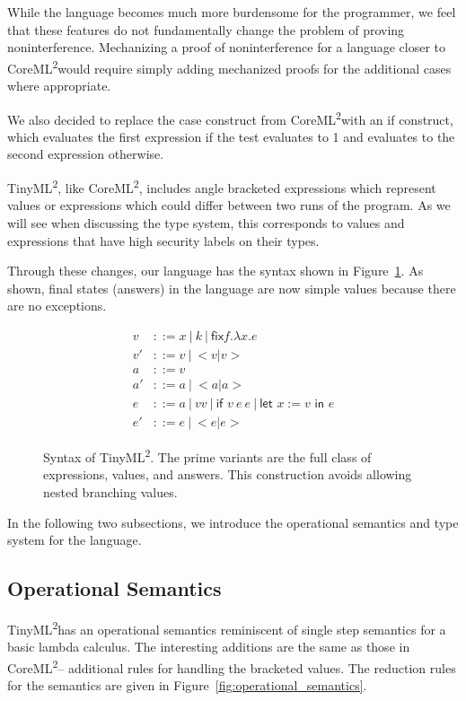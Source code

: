 \documentclass[a4paper,twocolumn]{article}
\newcommand{\langName}[0]{TinyML\textsuperscript{2}}
\newcommand{\origLang}[0]{CoreML\textsuperscript{2}}
\theoremstyle{plain}
\theoremstyle{definition}
\begin{document}
While the language becomes much more burdensome for the programmer, we
feel that these features do not fundamentally change the problem of proving
noninterference.  Mechanizing a proof of noninterference for a
language closer to \origLang would require simply adding mechanized proofs
for the additional cases where appropriate.

We also decided to replace the
\textsf{case} construct from \origLang with an \textsf{if} construct, which
evaluates the first expression if the test evaluates to 1 and evaluates to the
second expression otherwise.

\langName, like \origLang, includes angle bracketed expressions which represent
values or expressions which could differ between two runs of the program.  As we
will see when discussing the type system, this corresponds to values and
expressions that have high security labels on their types.

Through these changes, our language has the syntax shown in
Figure~\ref{fig:syntax}.  As shown, final states (answers) in the language are
now simple values because there are no exceptions.

\begin{figure}[t]
  \begin{align}
    v & ::= x \: | \: k \: | \: \textsf{fix} f . \lambda x . e \tag*{ } \\
    v' & ::= v \: | \: <v | v> \tag{values}\\
    a & ::= v \tag*{ } \\
    a' & ::= a \: | \: <a | a> \tag{answers} \\
    e & ::= a \: | \: v v \: | \: \textsf{if } v \: e \: e \: | \: \textsf{let
    } x := v \textsf{ in } e \tag*{ } \\
    e' & ::= e \: | \: <e | e> \tag{expressions}
  \end{align}
  \caption{Syntax of \langName.  The prime variants are the full class of
  expressions, values, and answers.  This construction avoids allowing nested
  branching values.}
  \label{fig:syntax}
\end{figure}

In the following two subsections, we introduce the operational semantics and
type system for the language.

\subsection{Operational Semantics}

\langName has an operational semantics reminiscent of single step semantics for a basic lambda calculus.  The interesting
additions are the same as those in \origLang -- additional rules
for handling the bracketed values.  The reduction rules for the semantics are
given in Figure~\ref{fig:operational_semantics}.
\end{document}
